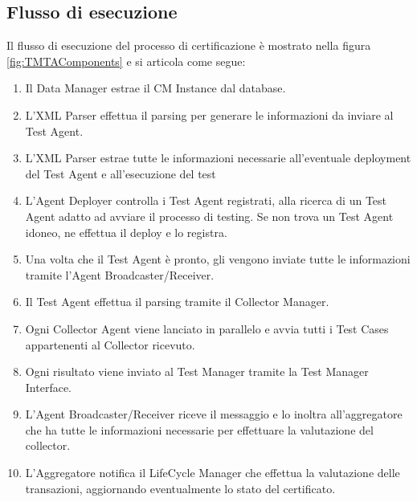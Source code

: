 \documentclass[../main.tex]{subfiles}
\begin{document}
\subsection{Flusso di esecuzione}
Il flusso di esecuzione del processo di certificazione è mostrato nella figura \ref{fig:TMTAComponents} e si articola come segue:
\begin{enumerate}
\item Il Data Manager estrae il CM Instance dal database.
\item L'XML Parser effettua il parsing per generare le informazioni da inviare al Test Agent.
\item L'XML Parser estrae tutte le informazioni necessarie all'eventuale deployment del Test Agent e all'esecuzione del test
\item L'Agent Deployer controlla i Test Agent registrati, alla ricerca di un Test Agent adatto ad avviare il processo di testing. Se non trova un Test Agent idoneo, ne effettua il deploy e lo registra.
\item Una volta che il Test Agent è pronto, gli vengono inviate tutte le informazioni tramite l'Agent Broadcaster/Receiver.
\item Il Test Agent effettua il parsing tramite il Collector Manager.
\item Ogni Collector Agent viene lanciato in parallelo e avvia tutti i Test Cases appartenenti al Collector ricevuto.
\item Ogni risultato viene inviato  al Test Manager tramite la Test Manager Interface.
\item L'Agent Broadcaster/Receiver riceve il messaggio e lo inoltra all'aggregatore che ha tutte le informazioni necessarie per effettuare la valutazione del collector.
\item L'Aggregatore notifica il LifeCycle Manager che effettua la valutazione delle transazioni, aggiornando eventualmente lo stato del certificato.
\end{enumerate}
\end{document}

